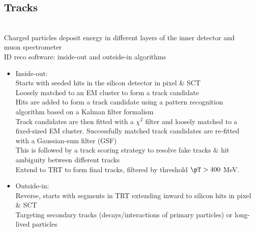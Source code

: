 \documentclass[../thesis.tex]{subfiles}
\begin{document}
\subsection{Tracks}
\citep{reco:track}\\
Charged particles deposit energy in different layers of the inner detector and muon spectrometer\\
ID reco software: inside-out and outside-in algorithms\\
\begin{itemize}

\item Inside-out: \citep{reco:io}\\
Starts with seeded hits in the silicon detector in pixel \& SCT\\
Loosely matched to an EM cluster to form a track candidate\\
Hits are added to form a track candidate using a pattern recognition algorithm based on a Kalman filter formalism \citep{reco:kalman}\\
Track candidates are then fitted with a $\chi^2$ filter \citep{reco:track_chi2} and loosely matched to a fixed-sized EM cluster. Successfully matched track candidates are re-fitted with a Gaussian-sum filter (GSF) \citep{reco:track_gsf}\\
This is followed by a track scoring strategy to resolve fake tracks \& hit ambiguity between different tracks \citep{reco:track_ambiguity}\\
Extend to TRT to form final tracks, filtered by threshold $\pT > 400$ MeV.\\
\item Outside-in: \citep{reco:oi}\\
Reverse, starts with segments in TRT extending inward to silicon hits in pixel \& SCT\\
Targeting secondary tracks (decays/interactions of primary particles) or long-lived particles
\end{itemize}
\end{document}
